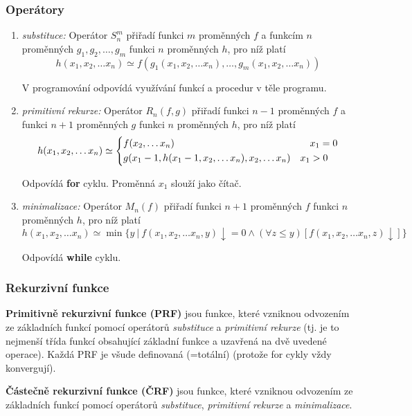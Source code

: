\documentclass[11pt]{report} %
\numberwithin{equation}{section}
\begin{document}
\subsubsection{Operátory}
\begin{enumerate}[label=\Roman*.]
	\item \textit{substituce:} Operátor $S_n^m$ přiřadí funkci $m$ proměnných $f$ a funkcím $n$ proměnných $g_1, g_2, \dots, g_m$ funkci $n$ proměnných $h$, pro níž platí 
	$$h(x_1,x_2,\dots x_n) \simeq f(g_1(x_1,x_2,\dots x_n), \dots, g_m(x_1,x_2,\dots x_n))$$
	
	V programování odpovídá využívání funkcí a procedur v těle programu.
	
	\item \textit{primitivní rekurze:} Operátor $R_n(f,g)$ přiřadí funkci $n-1$ proměnných $f$ a funkci $n+1$ proměnných $g$ funkci $n$ proměnných $h$, pro níž platí
	$$
	h(x_1,x_2,\dots x_n) \simeq
	\begin{dcases}
	f(x_2,\dots x_n) &\quad x_1 = 0 \\
	g(x_1 - 1, h(x_1 - 1,x_2,\dots x_n), x_2,\dots x_n) & x_1 > 0 \\
	\end{dcases}
	$$
	
	Odpovídá \textbf{for} cyklu. Proměnná $x_1$ slouží jako čítač.
	
	\item \textit{minimalizace:} Operátor $M_n(f)$ přiřadí funkci $n+1$ proměnných $f$ funkci $n$ proměnných $h$, pro níž platí
	$$h(x_1,x_2,\dots x_n) \simeq \min\{y\ |\ f(x_1,x_2,\dots x_n,y){\downarrow}=0 \wedge (\forall z \leq y)[f(x_1,x_2,\dots x_n,z){\downarrow}]\}$$
	
	Odpovídá \textbf{while} cyklu.
\end{enumerate}

\subsubsection{Rekurzivní funkce}
\textbf{Primitivně rekurzivní funkce (PRF)} jsou funkce, které vzniknou odvozením ze základních funkcí pomocí operátorů \textit{substituce} a \textit{primitivní rekurze} (tj. je to nejmenší třída funkcí obsahující základní funkce a uzavřená na dvě uvedené operace). Každá PRF je všude definovaná (=totální) (protože for cykly vždy konvergují).

\textbf{Částečně rekurzivní funkce (ČRF)} jsou funkce, které vzniknou odvozením ze základních funkcí pomocí operátorů \textit{substituce}, \textit{primitivní rekurze} a \textit{minimalizace}.
\end{document}

